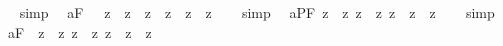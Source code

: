 \begin{isabellebody}
\isadelimproof
\ %
\endisadelimproof
%
\isatagproof
{}\isamarkupfalse%
\ simp\ \isamarkupfalse%
%
\endisatagproof
{\isafoldproof}%
%
\isadelimproof
%
\endisadelimproof
\isanewline
{}\isamarkupfalse%
\ a{}{}{\isacharunderscore}{}{\isacharunderscore}F{\isacharcolon}\ \ {\isachardoublequoteopen}{\isacharbrackleft}{\isacharparenleft}{\isacharsemicolon}{\isasymphi}{\isacharsemicolon}\ {\isasymrightarrow}\isactrlsup z\ {\isacharparenleft}{\isacharsemicolon}{\isasympsi}{\isacharsemicolon}\ {\isasymrightarrow}\isactrlsup z\ {\isacharsemicolon}{\isasymchi}{\isacharsemicolon}{\isacharparenright}{\isacharparenright}\ {\isasymrightarrow}\isactrlsup z\ {\isacharparenleft}{\isacharparenleft}{\isacharsemicolon}{\isasymphi}{\isacharsemicolon}\ {\isasymrightarrow}\isactrlsup z\ {\isacharsemicolon}{\isasympsi}{\isacharsemicolon}{\isacharparenright}\ {\isasymrightarrow}\isactrlsup z\ {\isacharparenleft}{\isacharsemicolon}{\isasymphi}{\isacharsemicolon}\ {\isasymrightarrow}\isactrlsup z\ {\isacharsemicolon}{\isasymchi}{\isacharsemicolon}{\isacharparenright}{\isacharparenright}{\isacharbrackright}{\isachardoublequoteclose}%
\isadelimproof
\ %
\endisadelimproof
%
\isatagproof
{}\isamarkupfalse%
\ simp\ \isamarkupfalse%
%
\endisatagproof
{\isafoldproof}%
%
\isadelimproof
%
\endisadelimproof
\isanewline
{}\isamarkupfalse%
\ a{}{}{\isacharunderscore}{}{\isacharunderscore}PF{\isacharcolon}\ {\isachardoublequoteopen}{\isacharbrackleft}{\isacharparenleft}{\isasymnot}\isactrlsup z\ {\isacharcomma}{\isasymphi}{\isacharcomma}\ {\isasymrightarrow}\isactrlsup z\ {\isasymnot}\isactrlsup z\ {\isacharcomma}{\isasympsi}{\isacharcomma}{\isacharparenright}\ {\isasymrightarrow}\isactrlsup z\ {\isacharparenleft}{\isasymnot}\isactrlsup z\ {\isacharcomma}{\isasymphi}{\isacharcomma}\ {\isasymrightarrow}\isactrlsup z\ {\isacharcomma}{\isasympsi}{\isacharcomma}{\isacharparenright}\ {\isasymrightarrow}\isactrlsup z\ {\isacharcomma}{\isasymphi}{\isacharcomma}{\isacharbrackright}{\isachardoublequoteclose}%
\isadelimproof
\ %
\endisadelimproof
%
\isatagproof
{}\isamarkupfalse%
\ simp\ \isamarkupfalse%
%
\endisatagproof
{\isafoldproof}%
%
\isadelimproof
%
\endisadelimproof
\isanewline
{}\isamarkupfalse%
\ a{}{}{\isacharunderscore}{}{\isacharunderscore}F{\isacharcolon}\ \ {\isachardoublequoteopen}{\isacharbrackleft}{\isacharparenleft}{\isasymnot}\isactrlsup z\ {\isacharsemicolon}{\isasymphi}{\isacharsemicolon}\ {\isasymrightarrow}\isactrlsup z\ {\isasymnot}\isactrlsup z\ {\isacharsemicolon}{\isasympsi}{\isacharsemicolon}{\isacharparenright}\ {\isasymrightarrow}\isactrlsup z\ {\isacharparenleft}{\isasymnot}\isactrlsup z\ {\isacharsemicolon}{\isasymphi}{\isacharsemicolon}\ {\isasymrightarrow}\isactrlsup z\ {\isacharsemicolon}{\isasympsi}{\isacharsemicolon}{\isacharparenright}\ {\isasymrightarrow}\isactrlsup z\ {\isacharsemicolon}{\isasymphi}{\isacharsemicolon}{\isacharbrackright}{\isachardoublequoteclose}%

\end{isabellebody}
